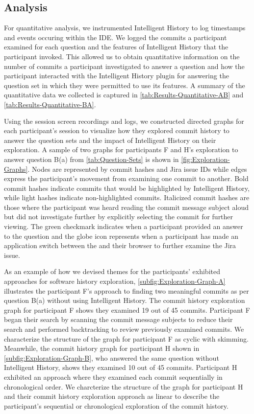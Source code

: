\subsection{Analysis}

For quantitative analysis, we instrumented Intelligent History to log timestamps and events occuring within the IDE.
We logged the commits a participant examined for each question and the features of Intelligent History that the participant invoked.
This allowed us to obtain quantitative information on the number of commits a participant investigated to answer a question and how the participant interacted with the Intelligent History plugin for answering the question set in which they were permitted to use its features.
A summary of the quantitative data we collected is captured in \autoref{tab:Results-Quantitative-AB} and \autoref{tab:Results-Quantitative-BA}.

Using the session screen recordings and logs, we constructed directed graphs for each participant's session to visualize how they explored commit history to answer the question sets and the impact of Intelligent History on their exploration.
A sample of two graphs for participants F and H's exploration to answer question B(a) from \autoref{tab:Question-Sets} is shown in \autoref{fig:Exploration-Graphs}.
Nodes are represented by commit hashes and Jira issue IDs while edges express the participant's movement from examining one commit to another.
Bold commit hashes indicate commits that would be highlighted by Intelligent History, while light hashes indicate non-highlighted commits.
Italicized commit hashes are those where the participant was heard reading the commit message subject aloud but did not investigate further by explicitly selecting the commit for further viewing.
The green checkmark indicates when a participant provided an answer to the question and the globe icon represents when a participant has made an application switch between the  and their browser to further examine the Jira issue.

As an example of how we devised themes for the participants' exhibited approaches for software history exploration, \autoref{subfig:Exploration-Graph-A} illustrates the participant F's approach to finding two meaningful commits as per question B(a) without using Intelligent History.
The commit history exploration graph for participant F shows they examined 19 out of 45 commits.
Participant F began their search by scanning the commit message subjects to reduce their search and performed backtracking to review previously examined commits.
We characterize the structure of the graph for participant F as cyclic with skimming.
Meanwhile, the commit history graph for participant H shown in \autoref{subfig:Exploration-Graph-B}, who answered the same question without Intelligent History, shows they examined 10 out of 45 commits.
Participant H exhibited an approach where they examined each commit sequentially in chronological order.
We charcterize the structure of the graph for participant H and their commit history exploration approach as linear to describe the participant's sequential or chronological exploration of the commit history.

